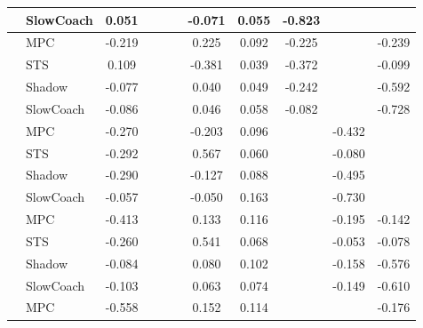 \begin{tabular}{|l|l|*{9}{c|}}
                                                           & SlowCoach &    0.051 &        &        &     & -0.071 &  0.055 &  -0.823 &      &       \\
\midrule
[True, False, False, False, True, True, True, False, True] & MPC &   -0.219 &        &        &     &  0.225 &  0.092 &  -0.225 &      &   -0.239 \\
                                                           & STS &    0.109 &        &        &     & -0.381 &  0.039 &  -0.372 &      &   -0.099 \\
                                                           & Shadow &   -0.077 &        &        &     &  0.040 &  0.049 &  -0.242 &      &   -0.592 \\
                                                           & SlowCoach &   -0.086 &        &        &     &  0.046 &  0.058 &  -0.082 &      &   -0.728 \\
\midrule
[True, False, False, False, True, True, False, True, False] & MPC &   -0.270 &        &        &     & -0.203 &  0.096 &      &  -0.432 &       \\
                                                           & STS &   -0.292 &        &        &     &  0.567 &  0.060 &      &  -0.080 &       \\
                                                           & Shadow &   -0.290 &        &        &     & -0.127 &  0.088 &      &  -0.495 &       \\
                                                           & SlowCoach &   -0.057 &        &        &     & -0.050 &  0.163 &      &  -0.730 &       \\
\midrule
[True, False, False, False, True, True, False, True, True] & MPC &   -0.413 &        &        &     &  0.133 &  0.116 &      &  -0.195 &   -0.142 \\
                                                           & STS &   -0.260 &        &        &     &  0.541 &  0.068 &      &  -0.053 &   -0.078 \\
                                                           & Shadow &   -0.084 &        &        &     &  0.080 &  0.102 &      &  -0.158 &   -0.576 \\
                                                           & SlowCoach &   -0.103 &        &        &     &  0.063 &  0.074 &      &  -0.149 &   -0.610 \\
\midrule
[True, False, False, False, True, True, False, False, True] & MPC &   -0.558 &        &        &     &  0.152 &  0.114 &      &      &   -0.176 \\

\end{tabular}
